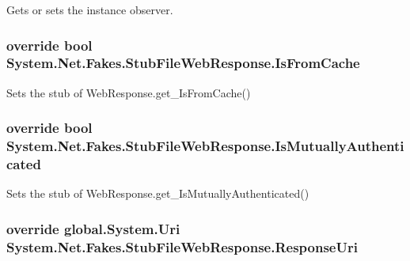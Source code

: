 Gets or sets the instance observer.

\hypertarget{class_system_1_1_net_1_1_fakes_1_1_stub_file_web_response_a0975e91d649256140844e87ea832fd28}{
\subsubsection[{Is\-From\-Cache}]{\setlength{\rightskip}{0pt plus 5cm}override bool System.\-Net.\-Fakes.\-Stub\-File\-Web\-Response.\-Is\-From\-Cache\hspace{0.3cm}{\ttfamily [get]}}}\label{class_system_1_1_net_1_1_fakes_1_1_stub_file_web_response_a0975e91d649256140844e87ea832fd28}


Sets the stub of Web\-Response.\-get\-\_\-\-Is\-From\-Cache()

\hypertarget{class_system_1_1_net_1_1_fakes_1_1_stub_file_web_response_a37220707aade5e5777ec337ae49b4d03}{
\subsubsection[{Is\-Mutually\-Authenticated}]{\setlength{\rightskip}{0pt plus 5cm}override bool System.\-Net.\-Fakes.\-Stub\-File\-Web\-Response.\-Is\-Mutually\-Authenticated\hspace{0.3cm}{\ttfamily [get]}}}\label{class_system_1_1_net_1_1_fakes_1_1_stub_file_web_response_a37220707aade5e5777ec337ae49b4d03}


Sets the stub of Web\-Response.\-get\-\_\-\-Is\-Mutually\-Authenticated()

\hypertarget{class_system_1_1_net_1_1_fakes_1_1_stub_file_web_response_a9dcd0d5e163b82a32d36b63d1fec4679}{
\subsubsection[{Response\-Uri}]{\setlength{\rightskip}{0pt plus 5cm}override global.\-System.\-Uri System.\-Net.\-Fakes.\-Stub\-File\-Web\-Response.\-Response\-Uri\hspace{0.3cm}{\ttfamily [get]}}}\label{class_system_1_1_net_1_1_fakes_1_1_stub_file_web_response_a9dcd0d5e163b82a32d36b63d1fec4679}


